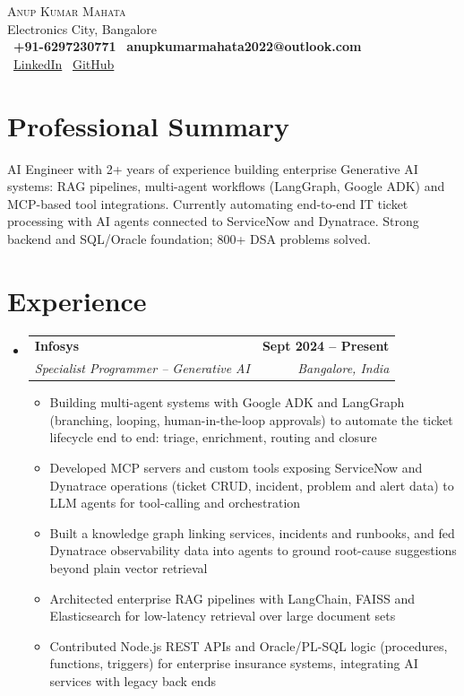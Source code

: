 \documentclass[a4paper,11pt]{article}
\makeatletter
\newcommand{\resumeItem}[1]{
  \item\small{{#1 \vspace{-2pt}}}
}
\newcommand{\resumeSubheading}[4]{
  \vspace{-2pt}\item
  \begin{tabular*}{1.0\textwidth}[t]{l@{\extracolsep{\fill}}r}
    \textbf{#1} & \textbf{\small #2} \\
    \textit{\small#3} & \textit{\small #4} \\
  \end{tabular*}\vspace{-7pt}
}
\newcommand{\resumeSubHeadingListStart}{\begin{itemize}[leftmargin=0.0in, label={}]}
\newcommand{\resumeSubHeadingListEnd}{\end{itemize}}
\newcommand{\resumeItemListStart}{\begin{itemize}[leftmargin=0.15in, itemsep=0pt, topsep=2pt]}
\newcommand{\resumeItemListEnd}{\end{itemize}\vspace{-6pt}}
\makeatother
\begin{document}
\begin{center}
    {\Huge \textsc{Anup Kumar Mahata}} \\ \vspace{3pt}
    Electronics City, Bangalore \\ \vspace{4pt}
    \small
    \faPhone\ \textbf{+91-6297230771} \quad
    \faEnvelope\ \textbf{anupkumarmahata2022@outlook.com} \\
    \faLinkedin\ \href{https://www.linkedin.com/in/anup-kumar-mahata-76952b246/}{LinkedIn} \quad
    \faGithub\ \href{https://github.com/Akm007git}{GitHub}
    \vspace{-8pt}
\end{center}

\section{Professional Summary}
\small{AI Engineer with 2+ years of experience building enterprise Generative AI systems: RAG pipelines, multi-agent workflows (LangGraph, Google ADK) and MCP-based tool integrations. Currently automating end-to-end IT ticket processing with AI agents connected to ServiceNow and Dynatrace. Strong backend and SQL/Oracle foundation; 800+ DSA problems solved.}

\section{Experience}
\resumeSubHeadingListStart

\resumeSubheading
{Infosys}{Sept 2024 -- Present}
{Specialist Programmer -- Generative AI}{Bangalore, India}
\resumeItemListStart
\resumeItem{Building multi-agent systems with Google ADK and LangGraph (branching, looping, human-in-the-loop approvals) to automate the ticket lifecycle end to end: triage, enrichment, routing and closure}
\resumeItem{Developed MCP servers and custom tools exposing ServiceNow and Dynatrace operations (ticket CRUD, incident, problem and alert data) to LLM agents for tool-calling and orchestration}
\resumeItem{Built a knowledge graph linking services, incidents and runbooks, and fed Dynatrace observability data into agents to ground root-cause suggestions beyond plain vector retrieval}
\resumeItem{Architected enterprise RAG pipelines with LangChain, FAISS and Elasticsearch for low-latency retrieval over large document sets}
\resumeItem{Contributed Node.js REST APIs and Oracle/PL-SQL logic (procedures, functions, triggers) for enterprise insurance systems, integrating AI services with legacy back ends}
\resumeItemListEnd
\resumeSubHeadingListEnd
\vspace{-5pt}
\end{document}
